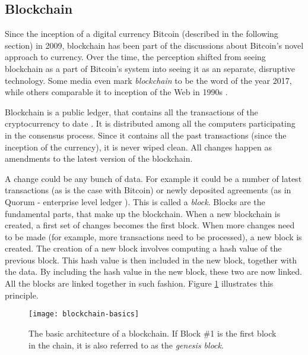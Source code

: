 \subsection{Blockchain}
% 
Since the inception of a digital currency Bitcoin (described in the following section) in 2009, blockchain has been part of the discussions about Bitcoin's novel approach to currency. Over the time, the perception shifted from seeing blockchain as a part of Bitcoin's system into seeing it as an separate, disruptive technology. Some media even mark \textit{blockchain} to be the word of the year 2017\footnotemark, while others comparable it to inception of the Web in 1990s \cite[p. 14]{Swan2015BlockchainEconomy}.
% 

Blockchain is a public ledger, that contains all the transactions of the cryptocurrency to date \cite{Swan2015BlockchainEconomy}. It is distributed among all the computers participating in the consensus process. Since it contains all the past transactions (since the inception of the currency), it is never wiped clean. All changes happen as amendments to the latest version of the blockchain.

A change could be any bunch of data. For example it could be a number of latest transactions (as is the case with Bitcoin) or newly deposited agreements (as in Quorum - enterprise level ledger \footnotemark ). This is called a \textit{block}. Blocks are the fundamental parts, that make up the blockchain. When a new blockchain is created, a first set of changes becomes the first block.
% 
% 
When more changes need to be made (for example, more transactions need to be processed), a new block is created. The creation of a new block involves computing a hash value of the previous block. This hash value is then included in the new block, together with the data. By including the hash value in the new block, these two are now linked. All the blocks are linked together in such fashion. Figure \ref{fig:blockch-basics} illustrates this principle. 
% 
\begin{figure}[t]
    \centering
    \texttt{[image: blockchain-basics]}
    \caption{The basic architecture of a blockchain. If Block \#1 is the first block in the chain, it is also referred to as the \textit{genesis block}.}
    \label{fig:blockch-basics}
\end{figure}

